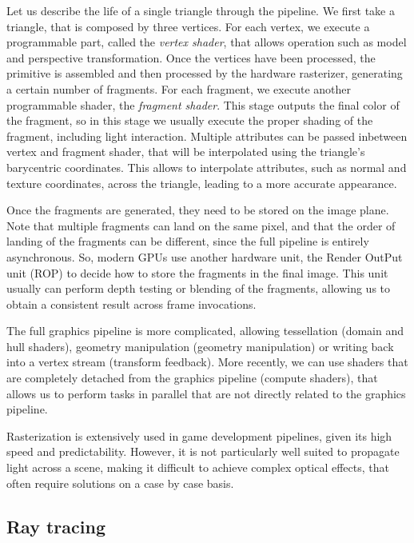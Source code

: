 Let us describe the life of a single triangle through the pipeline. We first take a triangle, that is composed by three vertices. For each vertex, we execute a programmable part, called the \emph{vertex shader}, that allows operation such as model and perspective transformation. Once the vertices have been processed, the primitive is assembled and then processed by the hardware rasterizer, generating a certain number of fragments. For each fragment, we execute another programmable shader, the \emph{fragment shader}. This stage outputs the final color of the fragment, so in this stage we usually execute the proper shading of the fragment, including light interaction. Multiple attributes can be passed inbetween vertex and fragment shader, that will be interpolated using the triangle's barycentric coordinates. This allows to interpolate attributes, such as normal and texture coordinates, across the triangle, leading to a more accurate appearance. 

Once the fragments are generated, they need to be stored on the image plane. Note that multiple fragments can land on the same pixel, and that the order of landing of the fragments can be different, since the full pipeline is entirely asynchronous. So, modern GPUs use another hardware unit, the Render OutPut unit (ROP) to decide how to store the fragments in the final image. This unit usually can perform depth testing or blending of the fragments, allowing us to obtain a consistent result across frame invocations.

The full graphics pipeline is more complicated, allowing tessellation (domain and hull shaders), geometry manipulation (geometry manipulation) or writing back into a vertex stream (transform feedback). More recently, we can use shaders that are completely detached from the graphics pipeline (compute shaders), that allows us to perform tasks in parallel that are not directly related to the graphics pipeline. 

Rasterization is extensively used in game development pipelines, given its high speed and predictability. However, it is not particularly well suited to propagate light across a scene, making it difficult to achieve complex optical effects, that often require solutions on a case by case basis.

\subsection{Ray tracing}


